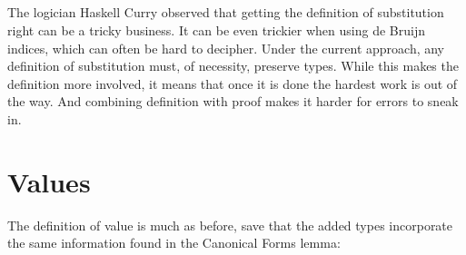 \begin{fence}
\begin{code}
\<%
\\
\>[0]\AgdaSpace{}%
\AgdaSymbol{=}\AgdaSpace{}%
\AgdaSpace{}%
\AgdaSymbol{(}\AgdaOperator{\AgdaFunction{\#}}\AgdaSpace{}%
\AgdaSpace{}%
\AgdaSpace{}%
\AgdaSymbol{(}\AgdaOperator{\AgdaFunction{\#}}\AgdaSpace{}%
\AgdaSpace{}%
\AgdaSpace{}%
\AgdaSymbol{))}\<%
\\
%
\\[\AgdaEmptyExtraSkip]%
\>[0]\AgdaFunction{\AgdaUnderscore{}}\AgdaSpace{}%
\AgdaSymbol{:}\AgdaSpace{}%
\AgdaSpace{}%
\AgdaOperator{\AgdaFunction{[}}\AgdaSpace{}%
\AgdaSpace{}%
\AgdaOperator{\AgdaFunction{]}}\AgdaSpace{}%
\AgdaSpace{}%
\<%
\\
\>[0]\AgdaSymbol{\AgdaUnderscore{}}\AgdaSpace{}%
\AgdaSymbol{=}\AgdaSpace{}%
\<%
\end{code}
\end{fence}

The logician Haskell Curry observed that getting the definition of
substitution right can be a tricky business. It can be even trickier
when using de Bruijn indices, which can often be hard to decipher. Under
the current approach, any definition of substitution must, of necessity,
preserve types. While this makes the definition more involved, it means
that once it is done the hardest work is out of the way. And combining
definition with proof makes it harder for errors to sneak in.

\hypertarget{values}{%
\section{Values}\label{values}}

The definition of value is much as before, save that the added types
incorporate the same information found in the Canonical Forms lemma:

